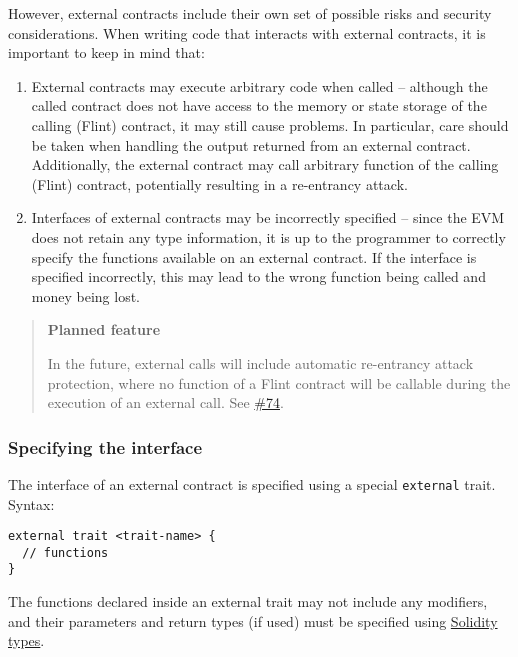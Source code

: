 However, external contracts include their own set of possible risks and security considerations. When writing code that interacts with external contracts, it is important to keep in mind that:

\begin{enumerate}
	\item External contracts may execute arbitrary code when called – although the called contract does not have access to the memory or state storage of the calling (Flint) contract, it may still cause problems. In particular, care should be taken when handling the output returned from an external contract. Additionally, the external contract may call arbitrary function of the calling (Flint) contract, potentially resulting in a re-entrancy attack.
	\item Interfaces of external contracts may be incorrectly specified – since the EVM does not retain any type information, it is up to the programmer to correctly specify the functions available on an external contract. If the interface is specified incorrectly, this may lead to the wrong function being called and money being lost.
\end{enumerate}

\begin{quote}
\textbf{Planned feature}

In the future, external calls will include automatic re-entrancy attack protection, where no function of a Flint contract will be callable during the execution of an external call. See \href{https://github.com/flintrocks/flint/issues/74}{\#74}.
\end{quote}

\subsubsection{Specifying the interface}
\label{sec:appendix-b-specifying-the-interface}

The interface of an external contract is specified using a special \texttt{external} trait. Syntax:

\begin{verbatim}
external trait <trait-name> {
  // functions
}
\end{verbatim}

The functions declared inside an external trait may not include any modifiers, and their parameters and return types (if used) must be specified using \hyperref[sec:appendix-b-solidity-types]{Solidity types}.

